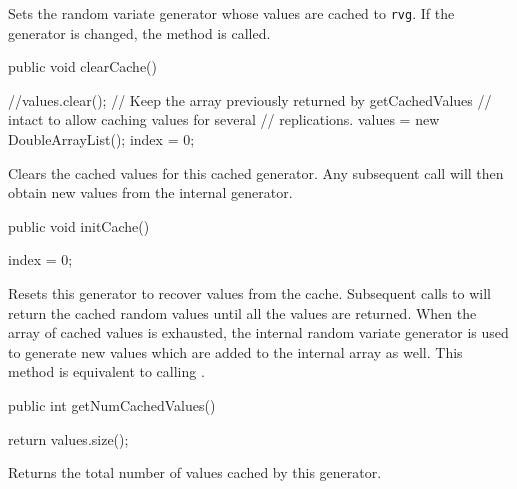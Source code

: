 \begin{tabb}   Sets the random variate generator whose values are cached to
 \texttt{rvg}.  If the generator is changed, the 
 method is called.
\end{tabb}
\begin{htmlonly}
\end{htmlonly}
\begin{code}

   public void clearCache()\begin{hide} {
      //values.clear();
      // Keep the array previously returned by getCachedValues
      // intact to allow caching values for several
      // replications.
      values = new DoubleArrayList();
      index = 0;
   }\end{hide}
\end{code}
\begin{tabb}   Clears the cached values for this cached generator.
 Any subsequent call will then obtain new values
 from the internal generator.
\end{tabb}
\begin{code}

   public void initCache()\begin{hide} {
      index = 0;
   }\end{hide}
\end{code}
\begin{tabb}   Resets this generator to recover values from the cache.
 Subsequent calls
 to  will return the cached random
 values until all the values are returned.  When the array
 of cached values is exhausted, the internal random variate
 generator is used to generate new values which are added
 to the internal array as well.
 This method is equivalent to calling .
\end{tabb}
\begin{code}

   public int getNumCachedValues()\begin{hide} {
      return values.size();
   }\end{hide}
\end{code}
\begin{tabb}   Returns the total number of values cached by this generator.
\end{tabb}
\begin{htmlonly}
\end{htmlonly}
